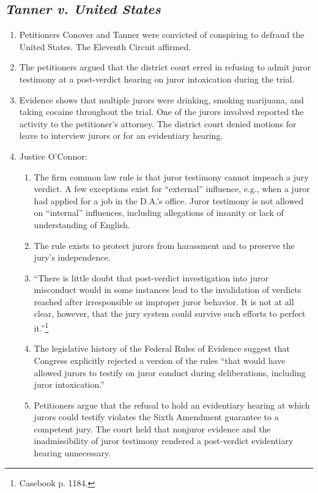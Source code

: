 \subsection{\emph{Tanner v. United States}}

\begin{enumerate}
    \item Petitioners Conover and Tanner were convicted of conspiring to defraud the United States. The Eleventh Circuit affirmed.
    \item The petitioners argued that the district court erred in refusing to admit juror testimony at a post-verdict hearing on juror intoxication during the trial.
    \item Evidence shows that multiple jurors were drinking, smoking marijuana, and taking cocaine throughout the trial. One of the jurors involved reported the activity to the petitioner's attorney. The district court denied motions for leave to interview jurors or for an evidentiary hearing.
    \item Justice O'Connor:
    \begin{enumerate}
        \item The firm common law rule is that juror testimony cannot impeach a jury verdict. A few exceptions exist for ``external'' influence, e.g., when a juror had applied for a job in the D.A.'s office. Juror testimony is not allowed on ``internal'' influences, including allegations of insanity or lack of understanding of English.
        \item The rule exists to protect jurors from harassment and to preserve the jury's independence.
        \item ``There is little doubt that post-verdict investigation into juror misconduct would in some instances lead to the invalidation of verdicts reached after irresponsible or improper juror behavior. It is not at all clear, however, that the jury system could survive such efforts to perfect it.''\footnote{Casebook p. 1184.}
        \item The legislative history of the Federal Rules of Evidence suggest that Congress explicitly rejected a version of the rules ``that would have allowed jurors to testify on juror conduct during deliberations, including juror intoxication.''
        \item Petitioners argue that the refusal to hold an evidentiary hearing at which jurors could testify violates the Sixth Amendment guarantee to a competent jury. The court held that nonjuror evidence and the inadmissibility of juror testimony rendered a post-verdict evidentiary hearing unnecessary.

\end{enumerate}
\end{enumerate}
